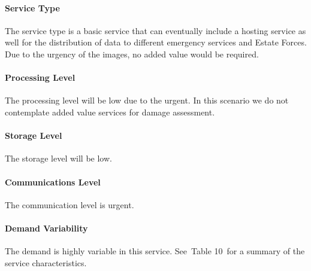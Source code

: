 \documentclass[a4paper]{article}
\begin{document}
\paragraph[Service Type]{ Service Type}
{
The service type is a basic service that can eventually include a
hosting service as well for the distribution of data to different
emergency services and Estate Forces. Due to the urgency of the images,
no added value would be required.\ }

\paragraph[Processing Level]{ Processing Level}
{
The processing level will be low due to the urgent. In this scenario we
do not contemplate added value services for damage assessment.}

\paragraph[Storage Level]{ Storage Level}
{
The storage level will be low.}

\paragraph[Communications Level]{ Communications
Level}
{
The communication level is urgent.}

\paragraph[Demand Variability]{ Demand
Variability}
\foreignlanguage{english}{The demand is highly variable in this service.
See\ }Table 10\foreignlanguage{english}{\ for a summary of the service
characteristics.}


\bigskip

\end{document}

